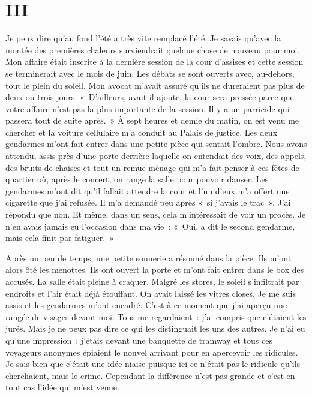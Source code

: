\documentclass[french,twoside]{book} %
\newcommand\chapteropen{} %
\newcommand\chaptercont{} %
\begin{document}
\chapteropen
\chapter[{III}]{III}
\label{II3}

\chaptercont
\noindent Je peux dire qu’au fond l’été a très vite remplacé l’été. Je savais qu’avec la montée des premières chaleurs surviendrait quelque chose de nouveau pour moi. Mon affaire était inscrite à la dernière session de la cour d’assises et cette session se terminerait avec le mois de juin. Les débats se sont ouverts avec, au-dehors, tout le plein du soleil. Mon avocat m’avait assuré qu’ils ne dureraient pas plus de deux ou trois jours. « D'ailleurs, avait-il ajoute, la cour sera pressée parce que votre affaire n’est pas la plus importante de la session. Il y a un parricide qui passera tout de suite après. » À sept heures et demie du matin, on est venu me chercher et la voiture cellulaire m’a conduit au Palais de justice. Les deux gendarmes m’ont fait entrer dans une petite pièce qui sentait l’ombre. Nous avons attendu, assis près d’une porte derrière laquelle on entendait des voix, des appels, des bruits de chaises et tout un remue-ménage qui m’a fait penser à ces fêtes de quartier où, après le concert, on range la salle pour pouvoir danser. Les gendarmes m’ont dit qu’il fallait attendre la cour et l’un d’eux m’a offert une cigarette que j’ai refusée. Il m’a demandé peu après « si j’avais le trac ». J'ai répondu que non. Et même, dans un sens, cela m’intéressait de voir un procès. Je n’en avais jamais eu l’occasion dans ma vie : « Oui, a dit le second gendarme, mais cela finit par fatiguer. »\par
Après un peu de temps, une petite sonnerie a résonné dans la pièce. Ils m’ont alors ôté les menottes. Ils ont ouvert la porte et m’ont fait entrer dans le box des accusés. La salle était pleine à craquer. Malgré les stores, le soleil s’infiltrait par endroits et l’air était déjà étouffant. On avait laissé les vitres closes. Je me suis assis et les gendarmes m’ont encadré. C'est à ce moment que j’ai aperçu une rangée de visages devant moi. Tous me regardaient : j’ai compris que c’étaient les jurés. Mais je ne peux pas dire ce qui les distinguait les uns des autres. Je n’ai eu qu’une impression : j’étais devant une banquette de tramway et tous ces voyageurs anonymes épiaient le nouvel arrivant pour en apercevoir les ridicules. Je sais bien que c’était une idée niaise puisque ici ce n’était pas le ridicule qu’ils cherchaient, mais le crime. Cependant la différence n’est pas grande et c’est en tout cas l’idée qui m’est venue.\par
\end{document}
